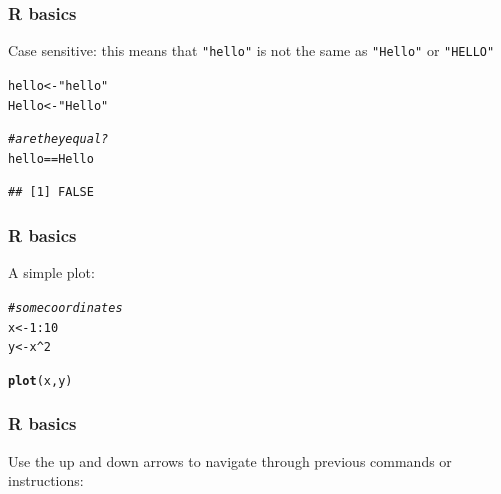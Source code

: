 \documentclass[12pt]{beamer}\usepackage[]{graphicx}\usepackage[]{color}
\makeatletter
\newcommand{\hlnum}[1]{\textcolor[rgb]{0.686,0.059,0.569}{#1}}%
\newcommand{\hlstr}[1]{\textcolor[rgb]{0.192,0.494,0.8}{#1}}%
\newcommand{\hlcom}[1]{\textcolor[rgb]{0.678,0.584,0.686}{\textit{#1}}}%
\newcommand{\hlopt}[1]{\textcolor[rgb]{0,0,0}{#1}}%
\newcommand{\hlstd}[1]{\textcolor[rgb]{0.345,0.345,0.345}{#1}}%
\newcommand{\hlkwb}[1]{\textcolor[rgb]{0.69,0.353,0.396}{#1}}%
\newcommand{\hlkwd}[1]{\textcolor[rgb]{0.737,0.353,0.396}{\textbf{#1}}}%
\newenvironment{kframe}{%
 \def\at@end@of@kframe{}%
 \ifinner\ifhmode%
  \def\at@end@of@kframe{\end{minipage}}%
  \begin{minipage}{\columnwidth}%
 \fi\fi%
 \def\FrameCommand##1{\hskip\@totalleftmargin \hskip-\fboxsep
 \colorbox{shadecolor}{##1}\hskip-\fboxsep
     \hskip-\linewidth \hskip-\@totalleftmargin \hskip\columnwidth}%
 \MakeFramed {\advance\hsize-\width
   \@totalleftmargin\z@ \linewidth\hsize
   \@setminipage}}%
 {\par\unskip\endMakeFramed%
 \at@end@of@kframe}
\newenvironment{knitrout}{}{} %
\makeatother
\begin{document}

\begin{frame}[fragile]
\frametitle{R basics}

Case sensitive: this means that \texttt{"hello"} is not the same as \texttt{"Hello"} or \texttt{"HELLO"}

\begin{knitrout}\footnotesize
{}\color{fgcolor}\begin{kframe}
\begin{alltt}
\hlstd{hello} \hlkwb{<-} \hlstr{"hello"}
\hlstd{Hello} \hlkwb{<-} \hlstr{"Hello"}

\hlcom{# are they equal?}
\hlstd{hello} \hlopt{==} \hlstd{Hello}
\end{alltt}
\begin{verbatim}
## [1] FALSE
\end{verbatim}
\end{kframe}
\end{knitrout}

\end{frame}


\begin{frame}[fragile]
\frametitle{R basics}

A simple plot:
\begin{knitrout}\footnotesize
{}\color{fgcolor}\begin{kframe}
\begin{alltt}
\hlcom{# some coordinates}
\hlstd{x} \hlkwb{<-} \hlnum{1}\hlopt{:}\hlnum{10}
\hlstd{y} \hlkwb{<-} \hlstd{x}\hlopt{^}\hlnum{2}

\hlkwd{plot}\hlstd{(x, y)}
\end{alltt}
\end{kframe}
\end{knitrout}

\end{frame}


\begin{frame}[fragile]
\frametitle{R basics}

Use the up and down arrows to navigate through previous commands or instructions:
\begin{center}
\end{center}

\end{frame}
\end{document}
